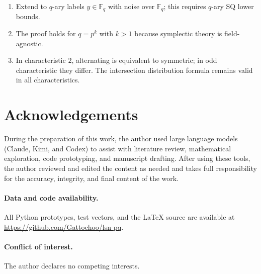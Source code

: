 \documentclass[11pt,a4paper]{article}
\theoremstyle{plain}
\theoremstyle{definition}
\newcommand{\F}{\mathbb{F}}
\begin{document}
\begin{enumerate}
\item Extend to $q$-ary labels $y \in \F_q$ with noise over $\F_q$; this requires $q$-ary SQ lower bounds.
\item The proof holds for $q = p^k$ with $k > 1$ because symplectic theory is field-agnostic.
\item In characteristic $2$, alternating is equivalent to symmetric; in odd characteristic they differ. The intersection distribution formula remains valid in all characteristics.
\end{enumerate}


\section*{Acknowledgements}
During the preparation of this work, the author used large language models (Claude, Kimi, and Codex) to assist with literature review, mathematical exploration, code prototyping, and manuscript drafting. After using these tools, the author reviewed and edited the content as needed and takes full responsibility for the accuracy, integrity, and final content of the work.

\paragraph{\textbf{Data and code availability.}} All Python prototypes, test vectors, and the \LaTeX{} source are available at \url{https://github.com/Gattochoo/lsn-pq}.

\paragraph{\textbf{Conflict of interest.}} The author declares no competing interests.
\end{document}
